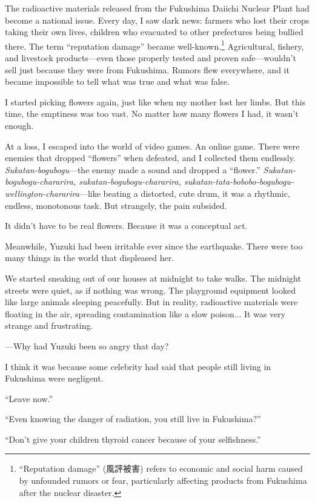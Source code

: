 \documentclass[
    a4paper,
    12pt,
    twoside,
    openany,
    UTF8,
    fontset=windows
]{ctexbook}
\begin{document}
The radioactive materials released from the Fukushima Daiichi Nuclear Plant had become a national issue. Every day, I saw dark news: farmers who lost their crops taking their own lives, children who evacuated to other prefectures being bullied there. The term ``reputation damage'' became well-known.\footnote{``Reputation damage'' (風評被害) refers to economic and social harm caused by unfounded rumors or fear, particularly affecting products from Fukushima after the nuclear disaster.} Agricultural, fishery, and livestock products—even those properly tested and proven safe—wouldn't sell just because they were from Fukushima. Rumors flew everywhere, and it became impossible to tell what was true and what was false.

I started picking flowers again, just like when my mother lost her limbs. But this time, the emptiness was too vast. No matter how many flowers I had, it wasn't enough.

At a loss, I escaped into the world of video games. An online game. There were enemies that dropped ``flowers'' when defeated, and I collected them endlessly. \textit{Sukatan-bogubogu}---the enemy made a sound and dropped a ``flower.'' \textit{Sukatan-bogubogu-chararira, sukatan-bogubogu-chararira, sukatan-tata-bobobo-bogubogu-wellington-chararira}---like beating a distorted, cute drum, it was a rhythmic, endless, monotonous task. But strangely, the pain subsided.

It didn't have to be real flowers. Because it was a conceptual act.

Meanwhile, Yuzuki had been irritable ever since the earthquake. There were too many things in the world that displeased her.

We started sneaking out of our houses at midnight to take walks. The midnight streets were quiet, as if nothing was wrong. The playground equipment looked like large animals sleeping peacefully. But in reality, radioactive materials were floating in the air, spreading contamination like a slow poison... It was very strange and frustrating.

---Why had Yuzuki been so angry that day?

I think it was because some celebrity had said that people still living in Fukushima were negligent.

``Leave now.''

``Even knowing the danger of radiation, you still live in Fukushima?''

``Don't give your children thyroid cancer because of your selfishness.''
\end{document}
